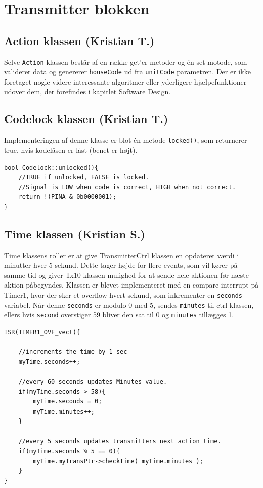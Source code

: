 
\section{Transmitter blokken}

\subsection{Action klassen (Kristian T.)}

Selve \texttt{Action}-klassen består af en række get'er metoder og én set motode, som validerer data og genererer \texttt{houseCode} ud fra \texttt{unitCode} parametren. Der er ikke foretaget nogle videre interessante algoritmer eller yderligere hjælpefunktioner udover dem, der forefindes i kapitlet Software Design.

\subsection{Codelock klassen (Kristian T.)}

Implementeringen af denne klasse er blot én metode \texttt{locked()}, som returnerer true, hvis kodelåsen er låst (benet er højt).

\begin{lstlisting}
bool Codelock::unlocked(){
	//TRUE if unlocked, FALSE is locked. 
	//Signal is LOW when code is correct, HIGH when not correct.
	return !(PINA & 0b0000001);
}
\end{lstlisting}

\subsection{Time klassen (Kristian S.)}

Time klassens roller er at give TransmitterCtrl klassen en opdateret værdi i minutter hver 5 sekund. Dette tager højde for flere events, som vil kører på samme tid og giver Tx10 klassen mulighed for at sende hele aktionen før næste aktion påbegyndes. Klassen er blevet implementeret med en compare interrupt på Timer1, hvor der sker et overflow hvert sekund, som inkrementer en \texttt{seconds} variabel. Når denne \texttt{seconds} er modulo 0 med 5, sendes \texttt{minutes} til ctrl klassen, ellers hvis \texttt{second} overstiger 59 bliver den sat til 0 og \texttt{minutes} tillægges 1. 

\begin{lstlisting}
ISR(TIMER1_OVF_vect){
	
	//increments the time by 1 sec
	myTime.seconds++;
	
	//every 60 seconds updates Minutes value.
	if(myTime.seconds > 58){
	    myTime.seconds = 0;
		myTime.minutes++;
	}
		
	//every 5 seconds updates transmitters next action time.
	if(myTime.seconds % 5 == 0){
		myTime.myTransPtr->checkTime( myTime.minutes );
	}
}
\end{lstlisting}

